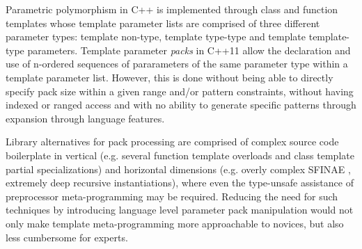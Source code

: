 
\p Parametric polymorphism in C++ is implemented through class and function templates whose template parameter lists are comprised of three different parameter types: template non-type, template type-type and template template-type parameters.
Template parameter \textit{packs} in C++11 \cite{cpp11} allow the declaration and use of n-ordered sequences of pararameters of the same parameter type within a template parameter list.
However, this is done without being able to directly specify pack size within a given range and/or pattern constraints, without having indexed or ranged access and with no ability to generate specific patterns through expansion through language features.

\p Library alternatives for pack processing are comprised of complex source code boilerplate in vertical (e.g. several function template overloads and class template partial specializations) and horizontal dimensions (e.g. overly complex SFINAE \cite{sfinae,JarviWL03}, extremely deep recursive instantiations), where even the type-unsafe assistance of preprocessor meta-programming may be required.
Reducing the need for such techniques by introducing language level parameter pack manipulation would not only make template meta-programming more approachable to novices, but also less cumbersome for experts.

